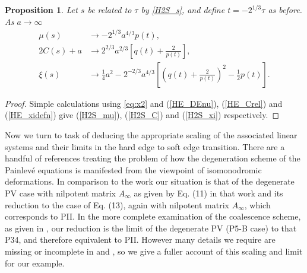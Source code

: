 \documentclass[10pt,reqno]{amsart}
\theoremstyle{plain}
\newtheorem{proposition}{Proposition}
\theoremstyle{definition}
\theoremstyle{remark}
\begin{document}
\begin{proposition}  \label{prop:9new}
Let $s$ be related to $\tau$ by \eqref{H2S_s}, and define $ t = -2^{1/3}\tau $ as before. As $a \rightarrow \infty$
\begin{align}
 \mu(s) & \to  -2^{1/3}a^{4/3}p(t),
\label{H2S_mu}\\
 2C(s)+a & \to 2^{2/3}a^{2/3}\left[q(t)+\frac{2}{p(t)}\right] ,
\label{H2S_C}\\
 \xi(s) & \to  \tfrac{1}{4}a^2-2^{-2/3}a^{4/3}\left[ \left(q(t)+\frac{2}{p(t)}\right)^2-\tfrac{1}{2}p(t) \right].
\label{H2S_xi}
\end{align}
\end{proposition}

\begin{proof}
Simple calculations using \eqref{eq:x2} and (\ref{HE_DEnu}), (\ref{HE_Crel}) and (\ref{HE_xidefn}) give (\ref{H2S_mu}),
(\ref{H2S_C}) and (\ref{H2S_xi}) respectively.
\end{proof}

Now we turn to task of deducing the appropriate scaling of the associated linear systems and their limits
in the hard edge to soft edge transition. There are a handful of references treating the problem of how the 
degeneration scheme of the Painlev\'e equations is manifested from the viewpoint of isomonodromic deformations. 
In comparison to the work \cite{Kapaev_2002} our situation is that of the
degenerate PV case with nilpotent matrix $ A_{\infty} $ as given by Eq. (11) in that work and its reduction to
the case of Eq. (13), again with nilpotent matrix $ A_{\infty} $, which corresponds to PII.
In the more complete examination of the coalescence scheme, as given in \cite{OO_2006}, our reduction is the limit
of the degenerate PV (P5-B case) to that P34, and therefore equivalent to PII. However many details we require are
missing or incomplete in \cite{Kapaev_2002} and \cite{OO_2006}, so we give a fuller account of this scaling and
limit for our example.
\end{document}
